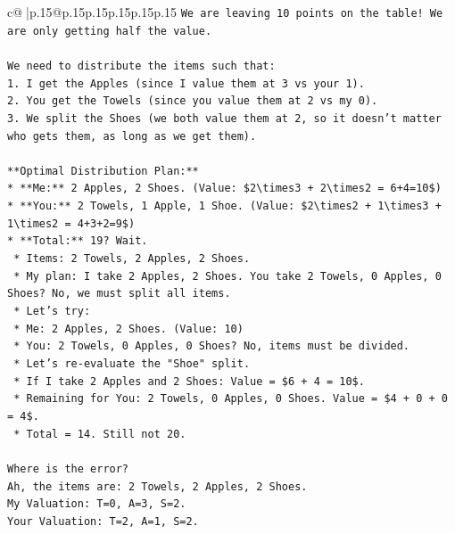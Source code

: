 \documentclass{article}
\begin{document}
{\begin{supertabular}{c@{$\;$}|p{.15\linewidth}@{}p{.15\linewidth}p{.15\linewidth}p{.15\linewidth}p{.15\linewidth}p{.15\linewidth}}
{{{\texttt{We are leaving 10 points on the table! We are only getting half the value.} \\
\\ 
\texttt{We need to distribute the items such that:} \\
\texttt{1.  I get the Apples (since I value them at 3 vs your 1).} \\
\texttt{2.  You get the Towels (since you value them at 2 vs my 0).} \\
\texttt{3.  We split the Shoes (we both value them at 2, so it doesn't matter who gets them, as long as we get them).} \\
\\ 
\texttt{**Optimal Distribution Plan:**} \\
\texttt{*   **Me:** 2 Apples, 2 Shoes. (Value: \$2\textbackslash{}times3 + 2\textbackslash{}times2 = 6+4=10\$)} \\
\texttt{*   **You:** 2 Towels, 1 Apple, 1 Shoe. (Value: \$2\textbackslash{}times2 + 1\textbackslash{}times3 + 1\textbackslash{}times2 = 4+3+2=9\$)} \\
\texttt{*   **Total:** 19? Wait.} \\
\texttt{    *   Items: 2 Towels, 2 Apples, 2 Shoes.} \\
\texttt{    *   My plan: I take 2 Apples, 2 Shoes. You take 2 Towels, 0 Apples, 0 Shoes? No, we must split all items.} \\
\texttt{    *   Let's try:} \\
\texttt{        *   Me: 2 Apples, 2 Shoes. (Value: 10)} \\
\texttt{        *   You: 2 Towels, 0 Apples, 0 Shoes? No, items must be divided.} \\
\texttt{        *   Let's re{-}evaluate the "Shoe" split.} \\
\texttt{        *   If I take 2 Apples and 2 Shoes: Value = \$6 + 4 = 10\$.} \\
\texttt{        *   Remaining for You: 2 Towels, 0 Apples, 0 Shoes. Value = \$4 + 0 + 0 = 4\$.} \\
\texttt{        *   Total = 14. Still not 20.} \\
\\ 
\texttt{Where is the error?} \\
\texttt{Ah, the items are: 2 Towels, 2 Apples, 2 Shoes.} \\
\texttt{My Valuation: T=0, A=3, S=2.} \\
\texttt{Your Valuation: T=2, A=1, S=2.} \\
\\ 
}}}
\end{supertabular}}
\end{document}
